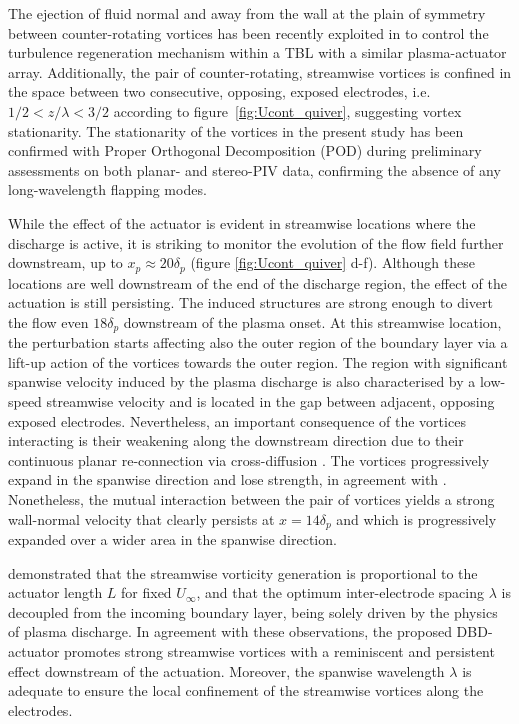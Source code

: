 The ejection of fluid normal and away from the wall at the plain of symmetry between counter-rotating vortices has been recently exploited in \citet{cheng_wong_hussain_schroder_zhou_2021} to control the turbulence regeneration mechanism within a TBL with a similar plasma-actuator array. Additionally, the pair of counter-rotating, streamwise vortices is confined in the space between two consecutive, opposing, exposed electrodes, i.e. $1/2<z/\lambda<3/2$ according to figure~\ref{fig:Ucont_quiver}, suggesting vortex stationarity.
The stationarity of the vortices in the present study has been confirmed with Proper Orthogonal Decomposition (POD) \citep{Lumley1967} during preliminary assessments on both planar- and stereo-PIV data, confirming the absence of any long-wavelength flapping modes. 

While the effect of the actuator is evident in streamwise locations where the discharge is active, it is striking to monitor the evolution of the flow field further downstream, up to $x_p\approx 20\delta_p$ (figure \ref{fig:Ucont_quiver} d-f). Although these locations are well downstream of the end of the discharge region, the effect of the actuation is still persisting. The induced structures are strong enough to divert the flow even $18\delta_p$ downstream of the plasma onset. At this streamwise location, the perturbation starts affecting also the outer region of the boundary layer via a lift-up action of the vortices towards the outer region. The region with significant spanwise velocity induced by the plasma discharge is also characterised by a low-speed streamwise velocity and is located in the gap between adjacent, opposing exposed electrodes. Nevertheless, an important consequence of the vortices interacting is their weakening along the downstream direction due to their continuous planar re-connection via cross-diffusion \citep{Hussain2011,Yao2020}. The vortices progressively expand in the spanwise direction and lose strength, in agreement with \citet{Wicks2015}. Nonetheless, the mutual interaction between the pair of vortices yields a strong wall-normal velocity that clearly persists at $\hat{x} = 14\delta_p$ and which is progressively expanded over a wider area in the spanwise direction.

\citet{Wicks2015} demonstrated that the streamwise vorticity generation is proportional to the actuator length $L$ for fixed $U_\infty$, and that the optimum inter-electrode spacing $\lambda$ is decoupled from the incoming boundary layer, being solely driven by the physics of plasma discharge. In agreement with these observations, the proposed DBD-actuator promotes strong streamwise vortices with a reminiscent and persistent effect downstream of the actuation. Moreover, the spanwise wavelength $\lambda$ is adequate to ensure the local confinement of the streamwise vortices along the electrodes.

